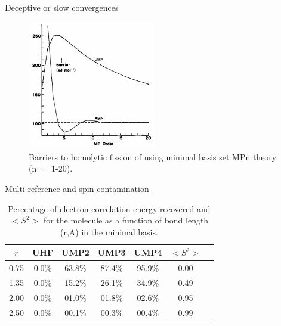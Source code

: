 \documentclass[xcolor=x11names,compress]{beamer}
\renewcommand{\(}{\begin{columns}}
\renewcommand{\)}{\end{columns}}
\newcommand{\<}[1]{\begin{column}{#1}}
\renewcommand{\>}{\end{column}}
\begin{document}
\begin{frame}{Deceptive or slow convergences}

\begin{figure}
    \centering
    \includegraphics[width=0.5\textwidth]{gill1986.png}
    \caption{\centering Barriers to homolytic fission of  using minimal basis set MPn theory (n~=~1-20).}
    \label{fig:my_label}
\end{figure}

    
\end{frame}

\begin{frame}{Multi-reference and spin contamination}
\begin{table}
    \centering
    \begin{tabular}{c c c c c c c}
\hline
 $r$ & UHF & UMP2 & UMP3 & UMP4 & $<S^2>$ \\
\hline
0.75 & 0.0\% & 63.8\% & 87.4\% & 95.9\% & 0.00\\
1.35 & 0.0\% & 15.2\% & 26.1\% & 34.9\% & 0.49\\
2.00 & 0.0\% & 01.0\% & 01.8\% & 02.6\% & 0.95\\
2.50 & 0.0\% & 00.1\% & 00.3\% & 00.4\% & 0.99\\
\hline
\end{tabular}
    \caption{\centering Percentage of electron correlation energy recovered and $<S^2>$ for the  molecule as a function of bond length (r,A) in the minimal basis.}
    \label{tab:my_label}
\end{table}

    
\end{frame}
\end{document}
